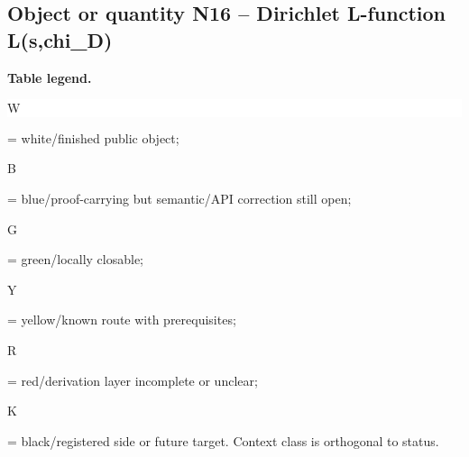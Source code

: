 \subsection*{Object or quantity N16 -- Dirichlet L-function L(s,chi\_D)}
\hypertarget{objproof:N16}{}
\par\smallskip\noindent\begin{minipage}{0.99\linewidth}\footnotesize\raggedright\textbf{Table legend.} \colorbox{white}{\strut W} = white/finished public object; \colorbox{cyan!20}{\strut B} = blue/proof-carrying but semantic/API correction still open; \colorbox{green!18}{\strut G} = green/locally closable; \colorbox{yellow!25}{\strut Y} = yellow/known route with prerequisites; \colorbox{red!20}{\strut R} = red/derivation layer incomplete or unclear; \colorbox{black!18}{\strut K} = black/registered side or future target. Context class is orthogonal to status.\end{minipage}\par\vspace{0.25em}
